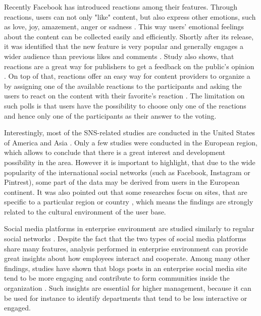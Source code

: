 Recently Facebook has introduced reactions among their features. Through reactions, users can not only "like" content, but also express other emotions, such as love, joy, amazement, anger or sadness \cite{shouldfacebookusereactions, howarenewspublishersreactingonfacebook}. This way users' emotional feelings about the content can be collected easily and efficiently. Shortly after its release, it was identified that the new feature is very popular and generally engages a wider audience than previous likes and comments \cite{shouldfacebookusereactions}. Study also shows, that reactions are a great way for publishers to get a feedback on the public's opinion \cite{howarenewspublishersreactingonfacebook}. On top of that, reactions offer an easy way for content providers to organize a by assigning one of the available reactions to the participants and asking the users to react on the content with their favorite's reaction \cite{shouldfacebookusereactions}. The limitation on such polls is that users have the possibility to choose only one of the reactions and hence only one of the participants as their answer to the voting.  

Interestingly, most of the SNS-related studies are conducted in the United States of America and Asia \cite{waheed2017investigation}. Only a few studies were conducted in the European region, which allows to conclude that there is a great interest and development possibility in the area. However it is important to highlight, that due to the wide popularity of the international social networks (such as Facebook, Instagram or Pintrest), some part of the data may be derived from users in the European continent. It was also pointed out that some researches focus on sites, that are specific to a particular region or country \cite{waheed2017investigation}, which means the findings are strongly related to the cultural environment of the user base.    

Social media platforms in enterprise environment are studied similarly to regular social networks \cite{guy2016whatsyourorganizationlike}. Despite the fact that the two types of social media platforms share many features, analysis performed in enterprise environment can provide great insights about how employees interact and cooperate. Among many other findings, studies have shown that blogs posts in an enterprise social media site tend to be more engaging and contribute to form communities inside the organization \cite{guy2016whatsyourorganizationlike}. Such insights are essential for higher management, because it can be used for instance to identify departments that tend to be less interactive or engaged.  


